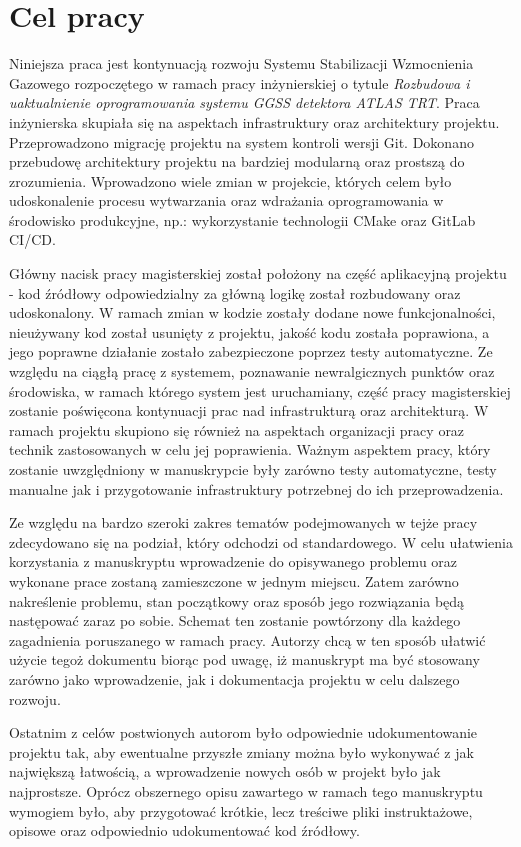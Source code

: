 \section{Cel pracy}


Niniejsza praca jest kontynuacją rozwoju Systemu Stabilizacji Wzmocnienia Gazowego rozpoczętego w ramach pracy
inżynierskiej o tytule \emph{Rozbudowa i uaktualnienie oprogramowania systemu GGSS detektora ATLAS TRT}. Praca inżynierska skupiała się na aspektach infrastruktury oraz architektury projektu. Przeprowadzono migrację projektu na system kontroli wersji Git. Dokonano przebudowę architektury projektu na bardziej modularną oraz prostszą do zrozumienia. Wprowadzono wiele zmian w projekcie, których celem było udoskonalenie procesu wytwarzania oraz wdrażania oprogramowania w środowisko produkcyjne, np.: wykorzystanie technologii CMake oraz GitLab CI/CD.


Główny nacisk pracy magisterskiej został położony na część aplikacyjną projektu - kod źródłowy odpowiedzialny za
główną logikę został rozbudowany oraz udoskonalony. W ramach zmian w kodzie zostały dodane nowe funkcjonalności,
nieużywany kod został usunięty z projektu, jakość kodu została poprawiona, a jego poprawne działanie zostało
zabezpieczone poprzez testy automatyczne. Ze względu na ciągłą pracę z systemem, poznawanie newralgicznych punktów oraz środowiska, w ramach którego system jest uruchamiany, część pracy magisterskiej zostanie poświęcona kontynuacji prac nad infrastrukturą oraz architekturą. W ramach projektu skupiono się również na aspektach organizacji pracy oraz technik zastosowanych w celu jej poprawienia. Ważnym aspektem pracy, który zostanie uwzględniony w manuskrypcie były zarówno testy automatyczne, testy manualne jak i przygotowanie infrastruktury potrzebnej do ich przeprowadzenia.


Ze względu na bardzo szeroki zakres tematów podejmowanych w tejże pracy zdecydowano się na podział, który odchodzi od standardowego. W celu ułatwienia korzystania z manuskryptu wprowadzenie do opisywanego problemu oraz wykonane prace zostaną zamieszczone w jednym miejscu. Zatem zarówno nakreślenie problemu, stan początkowy oraz sposób jego rozwiązania będą następować zaraz po sobie. Schemat ten zostanie powtórzony dla każdego zagadnienia poruszanego w ramach pracy. Autorzy chcą w ten sposób ułatwić użycie tegoż dokumentu biorąc pod uwagę, iż manuskrypt ma być stosowany zarówno jako wprowadzenie, jak i dokumentacja projektu w celu dalszego rozwoju.


Ostatnim z celów postwionych autorom było odpowiednie udokumentowanie projektu tak, aby ewentualne przyszłe zmiany można było wykonywać z jak największą łatwością, a wprowadzenie nowych osób w projekt było jak najprostsze. Oprócz obszernego opisu zawartego w ramach tego manuskryptu wymogiem było, aby przygotować krótkie, lecz treściwe pliki instruktażowe, opisowe oraz odpowiednio udokumentować kod źródłowy.